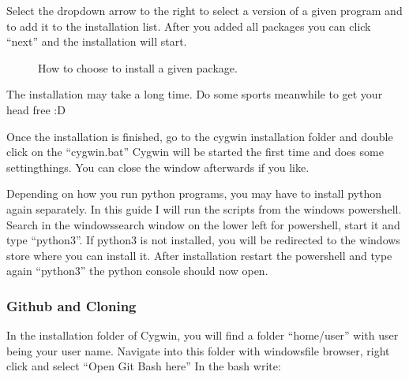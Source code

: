 \documentclass[letterpaper,10pt,english]{sphinxmanual}
\begin{document}
\sphinxAtStartPar
Select the drop\sphinxhyphen{}down arrow to the right to select a version of a given program and to add it to the installation list. After you added all packages you can click “next” and the installation will start.

\begin{figure}[htbp]
\centering
\capstart

\noindent{}
\caption{How to choose to install a given package.}\label{\detokenize{installation:id3}}\end{figure}

\begin{DUlineblock}{0em}
\item[] The installation may take a long time. Do some sports meanwhile to get your head free :D
\end{DUlineblock}

\begin{DUlineblock}{0em}
\item[] Once the installation is finished, go to the cygwin installation folder and double click on the “cygwin.bat” \sphinxhyphen{} Cygwin will be started the first time and does some setting\sphinxhyphen{}things. You can close the window afterwards if you like.
\end{DUlineblock}

\begin{DUlineblock}{0em}
\item[] Depending on how you run python programs, you may have to install python again separately. In this guide I will run the scripts from the windows powershell. Search in the windows\sphinxhyphen{}search window on the lower left for powershell, start it and type “python3”. If python3 is not installed, you will be redirected to the windows store where you can install it. After installation restart the powershell and type again “python3” \sphinxhyphen{} the python console should now open.
\end{DUlineblock}


\subsubsection{Github and Cloning}
\label{\detokenize{installation:github-and-cloning}}
\sphinxAtStartPar
In the installation folder of Cygwin, you will find a folder “home/user” with user being your user name.
Navigate into this folder with windows\sphinxhyphen{}file browser, right click and select “Open Git Bash here”
In the bash write:
\end{document}
